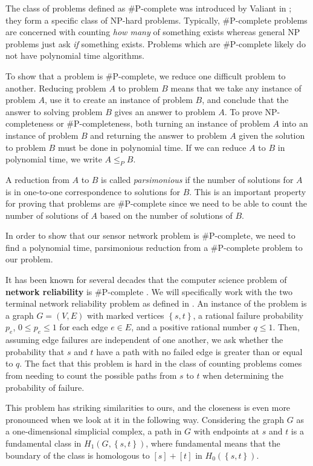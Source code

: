 \documentclass[10pt,twocolumn]{article} \usepackage{amsmath,epsf,amssymb,cite,pifont,amsthm, mathrsfs,epsfig,  bbm, amsthm,  setspace}
\renewcommand{\1}{\mathbbm{1}}
\begin{document}
The class of problems defined as \#P-complete was introduced by Valiant in \cite{Valiant};
they form a specific class of NP-hard problems.
Typically, \#P-complete problems are concerned with counting \textit{how many} of something
exists  whereas general NP problems just ask \textit{if} something exists.
Problems which are \#P-complete likely do not have polynomial time algorithms.

To show that a problem is \#P-complete, we reduce one difficult problem to another.
Reducing problem $A$ to problem $B$ means that we take any instance of problem $A$,
use it to create an instance of problem $B$, and conclude that the answer to solving problem $B$
gives an answer to problem $A$.
To prove NP-completeness or \#P-completeness,
both turning an instance of problem $A$ into an instance of problem $B$
and returning the answer to problem $A$ given the solution to problem $B$ must
be done in polynomial time.
If we can reduce $A$ to $B$ in polynomial time,  we write $A \leq_P B$.

A reduction from $A$ to $B$ is called \textit{parsimonious} if the number of solutions for $A$
is in one-to-one correspondence to solutions for $B$.
This is an important property for proving that problems are \#P-complete since we need to be
able to count the number of solutions of $A$ based on the number of solutions of $B$.

In order to show that our sensor network problem is \#P-complete,
we need to find a polynomial time, parsimonious reduction from a \#P-complete problem to our problem.


It has been known for several decades that the computer science problem of {\bf network reliability}
is \#P-complete \cite{Garey1979,Colbourn1987}.
We will specifically work with the two terminal network reliability problem as defined in \cite{Garey1979}.
An instance of the problem is a graph $G=(V,E)$ with marked vertices $\left\{ s,t \right\}$,
a rational failure probability $p_e$, $0 \leq p_e \leq 1$ for each edge $e \in E$,
and a positive rational number $q\leq 1$.
Then, assuming edge failures are independent of one another,
we ask whether the probability that $s$ and $t$ have a path with no failed edge
is greater than or equal to $q$.
The fact that this problem is hard in the class of counting problems comes from needing to count the possible paths from $s$ to $t$ when determining the probability of failure.

This problem has striking similarities to ours, and the closeness is even more pronounced
when we look at it in the following way.
Considering the graph $G$ as a one-dimensional simplicial complex, a path in $G$ with
endpoints at $s$ and $t$ is a fundamental class in $H_1(G,\left\{ s,t \right\})$,
where fundamental means that the boundary of the class is homologous to $[s]+[t]$ in
$H_0(\left\{ s,t \right\})$.
\end{document}
